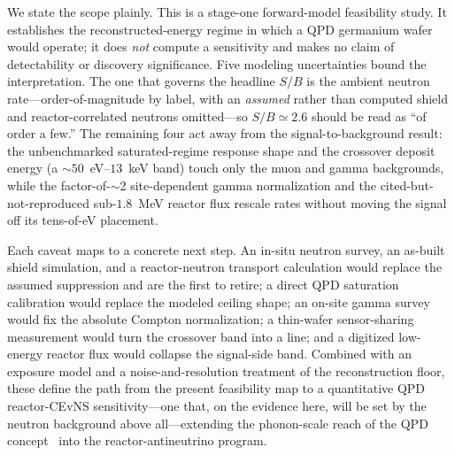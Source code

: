 We state the scope plainly. This is a stage-one forward-model feasibility
study. It establishes the reconstructed-energy regime in which a QPD germanium
wafer would operate; it does \emph{not} compute a sensitivity and makes no claim
of detectability or discovery significance. Five modeling uncertainties bound
the interpretation. The one that governs the headline $S/B$ is the ambient
neutron rate---order-of-magnitude by label, with an \emph{assumed} rather than
computed shield and reactor-correlated neutrons omitted---so $S/B\simeq2.6$
should be read as ``of order a few.'' The remaining four act away from the
signal-to-background result: the unbenchmarked saturated-regime response shape
and the crossover deposit energy (a $\sim$$50$~eV--$13$~keV band) touch only the
muon and gamma backgrounds, while the factor-of-$\sim$2 site-dependent gamma
normalization and the cited-but-not-reproduced sub-$1.8$~MeV reactor flux
rescale rates without moving the signal off its tens-of-eV placement.

Each caveat maps to a concrete next step. An in-situ neutron survey, an
as-built shield simulation, and a reactor-neutron transport calculation would
replace the assumed suppression and are the first to retire; a direct QPD
saturation calibration would replace the modeled ceiling shape; an on-site
gamma survey would fix the absolute Compton normalization; a thin-wafer
sensor-sharing measurement would turn the crossover band into a line; and a
digitized low-energy reactor flux would collapse the signal-side band. Combined
with an exposure model and a noise-and-resolution treatment of the
reconstruction floor, these define the path from the present feasibility map to
a quantitative QPD reactor-CEvNS sensitivity---one that, on the evidence here,
will be set by the neutron background above all---extending the phonon-scale
reach of the QPD concept~\cite{ramanathan2026} into the reactor-antineutrino
program.
